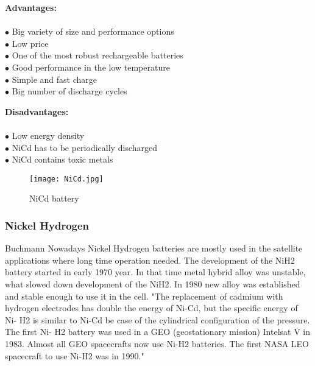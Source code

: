  \newpage

\begin{multicols}{2}

	\textbf{Advantages:} \\ \\
	$\bullet$ Big variety of size and performance options\\
	$\bullet$ Low price\\
	$\bullet$ One of the most robust rechargeable batteries\\
	$\bullet$ Good performance in the low temperature\\
	$\bullet$ Simple and fast charge\\
	$\bullet$ Big number of discharge cycles\\
	
	
	\columnbreak
	
	\textbf{Disadvantages:} \\ \\
	$\bullet$ Low energy density\\
	$\bullet$ NiCd has to be periodically discharged\\
	$\bullet$ NiCd contains toxic metals\\ 

\end{multicols}

\begin{figure}[h]
	\centering
	\texttt{[image: NiCd.jpg]}
	\caption{NiCd battery\cite{9}}
	\label{fig: EPS}
\end{figure}


\subsubsection{Nickel Hydrogen \label{sec:tech}}
Buchmann\cite{7} Nowadays Nickel Hydrogen batteries are mostly used in the satellite applications where long time operation needed. The development of the NiH2 battery started in early 1970 year. In that time metal hybrid alloy was unstable, what slowed down development of the NiH2. In 1980 new alloy was established and stable enough to use it in the cell. 
\cite{10}"The replacement of cadmium with hydrogen electrodes has double the energy of Ni-Cd, but the specific energy of Ni- H2 is similar to Ni-Cd be case of the cylindrical configuration of the pressure. The first Ni- H2 battery was used in a GEO (geostationary mission) Intelsat V in 1983.  Almost all GEO spacecrafts now use Ni-H2 batteries. The first NASA LEO spacecraft to use Ni-H2 was in 1990."


